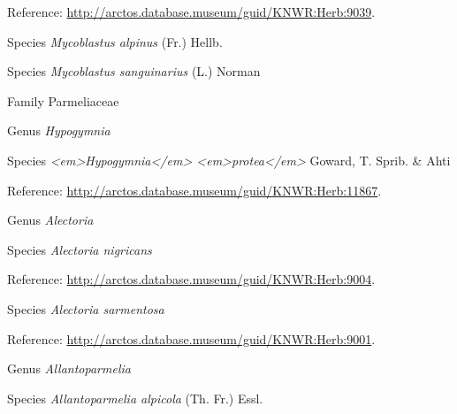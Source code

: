 \documentclass[9pt, article]{memoir}
\begin{document}
\begin{multicols}{2}
\vspace{6pt}Reference: 
\url{http://arctos.database.museum/guid/KNWR:Herb:9039}.

\vspace{6pt}\noindent\hspace{36pt}Species \textit{Mycoblastus alpinus} (Fr.) Hellb.


\vspace{6pt}\noindent\hspace{36pt}Species \textit{Mycoblastus sanguinarius} (L.) Norman


\vspace{6pt}\noindent\hspace{24pt}Family Parmeliaceae


\vspace{6pt}\noindent\hspace{30pt}Genus \textit{Hypogymnia}


\vspace{6pt}\noindent\hspace{36pt}Species \textit{<em>Hypogymnia</em> <em>protea</em>} Goward, T. Sprib. \& Ahti


\vspace{6pt}Reference: 
\url{http://arctos.database.museum/guid/KNWR:Herb:11867}.

\vspace{6pt}\noindent\hspace{30pt}Genus \textit{Alectoria}


\vspace{6pt}\noindent\hspace{36pt}Species \textit{Alectoria nigricans}


\vspace{6pt}Reference: 
\url{http://arctos.database.museum/guid/KNWR:Herb:9004}.

\vspace{6pt}\noindent\hspace{36pt}Species \textit{Alectoria sarmentosa}


\vspace{6pt}Reference: 
\url{http://arctos.database.museum/guid/KNWR:Herb:9001}.

\vspace{6pt}\noindent\hspace{30pt}Genus \textit{Allantoparmelia}


\vspace{6pt}\noindent\hspace{36pt}Species \textit{Allantoparmelia alpicola} (Th. Fr.) Essl.



\end{multicols}
\end{document}
